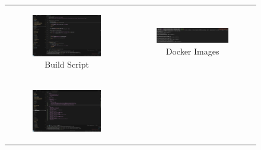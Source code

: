 \begin{figure}[h!]
    \centering
    \begin{adjustbox}{bgcolor=gray!20, padding=0.7em, margin=1ex}
        \begin{tabular}{cc}
            \begin{subfigure}{0.48\textwidth}
                \centering
                \includegraphics[width=\linewidth]{MWP-Project Report Template - BD-ML-June25/screenshots_federated/1_build_script.png}
                \caption{Build Script}
            \end{subfigure} &
            \begin{subfigure}{0.48\textwidth}
                \centering
                \includegraphics[width=\linewidth]{MWP-Project Report Template - BD-ML-June25/screenshots_federated/2_Docker_Images.png}
                \caption{Docker Images}
            \end{subfigure} \\
            \begin{subfigure}{0.48\textwidth}
                \centering
                \includegraphics[width=\linewidth]{MWP-Project Report Template - BD-ML-June25/screenshots_federated/3_Deployment_Script.png}

\end{subfigure}
\end{tabular}
\end{adjustbox}
\end{figure}
